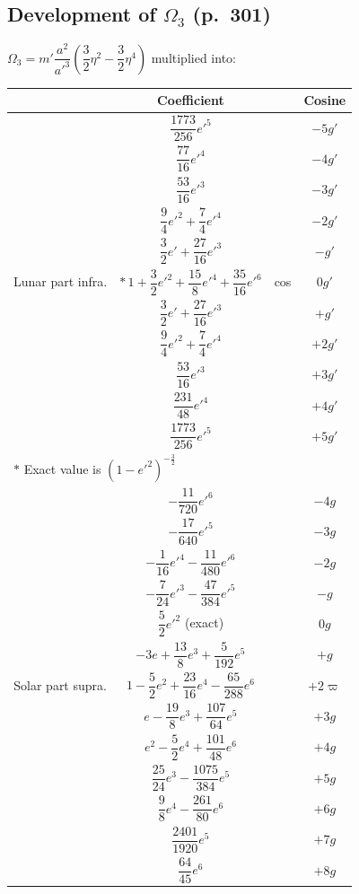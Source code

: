 \documentclass[11pt,a4paper]{book}
\begin{document}
{{\subsection{Development of $\Omega_3$ (p.~301)}

\noindent
$\Omega_3 = m' \dfrac{a^2}{a'^3} \left(\dfrac{3}{2}\eta^2 - \dfrac{3}{2}\eta^4\right)$ multiplied into:

\begin{center}
\begin{tabular}{c|c|c|c}
\toprule
& Coefficient & & Cosine \\
\midrule
\multirow{11}{*}{\parbox{2.5cm}{\centering Lunar part infra.}} 
& $\dfrac{1773}{256}e'^5$ & \multirow{11}{*}{cos} & $-5g'$ \\
& $\dfrac{77}{16}e'^4$ & & $-4g'$ \\
& $\dfrac{53}{16}e'^3$ & & $-3g'$ \\
& $\dfrac{9}{4}e'^2 + \dfrac{7}{4}e'^4$ & & $-2g'$ \\
& $\dfrac{3}{2}e' + \dfrac{27}{16}e'^3$ & & $-g'$ \\
& $*\,1 + \dfrac{3}{2}e'^2 + \dfrac{15}{8}e'^4 + \dfrac{35}{16}e'^6$ & & $0g'$ \\
& $\dfrac{3}{2}e' + \dfrac{27}{16}e'^3$ & & $+g'$ \\
& $\dfrac{9}{4}e'^2 + \dfrac{7}{4}e'^4$ & & $+2g'$ \\
& $\dfrac{53}{16}e'^3$ & & $+3g'$ \\
& $\dfrac{231}{48}e'^4$ & & $+4g'$ \\
& $\dfrac{1773}{256}e'^5$ & & $+5g'$ \\[6pt]
\multicolumn{4}{l}{$*$ Exact value is $(1 - e'^2)^{-\frac{3}{2}}$} \\
\midrule
\multirow{13}{*}{\parbox{2.5cm}{\centering Solar part supra.}} 
& $-\dfrac{11}{720}e'^6$ & \multirow{13}{*}{} & $-4g$ \\
& $-\dfrac{17}{640}e'^5$ & & $-3g$ \\
& $-\dfrac{1}{16}e'^4 - \dfrac{11}{480}e'^6$ & & $-2g$ \\
& $-\dfrac{7}{24}e'^3 - \dfrac{47}{384}e'^5$ & & $-g$ \\
& $\dfrac{5}{2}e'^2$ (exact) & & $0g$ \\
& $-3e + \dfrac{13}{8}e^3 + \dfrac{5}{192}e^5$ & & $+g$ \\
& $1 - \dfrac{5}{2}e^2 + \dfrac{23}{16}e^4 - \dfrac{65}{288}e^6$ & $+2g$ & $+2\varpi$ \\
& $e - \dfrac{19}{8}e^3 + \dfrac{107}{64}e^5$ & & $+3g$ \\
& $e^2 - \dfrac{5}{2}e^4 + \dfrac{101}{48}e^6$ & & $+4g$ \\
& $\dfrac{25}{24}e^3 - \dfrac{1075}{384}e^5$ & & $+5g$ \\
& $\dfrac{9}{8}e^4 - \dfrac{261}{80}e^6$ & & $+6g$ \\
& $\dfrac{2401}{1920}e^5$ & & $+7g$ \\
& $\dfrac{64}{45}e^6$ & & $+8g$ \\
\bottomrule
\end{tabular}
\end{center}

}}
\end{document}
